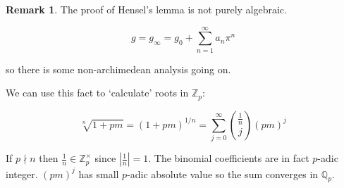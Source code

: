 \documentclass[openany]{amsbook}
\numberwithin{section}{chapter}
\theoremstyle{definition}
\newtheorem*{remark}{Remark}
\begin{document}
\begin{remark}
    The proof of Hensel's lemma is not purely algebraic.

    \[
        g = g_\infty = g_0 + \sum_{n=1}^{\infty} a_n \pi^n
    \]

    so there is some non-archimedean analysis going on.

    We can use this fact to `calculate' roots in \(\mathbb{Z}_p\):

    \[
        \sqrt[n]{1+pm} = (1+pm)^{1 / n} = \sum_{j=0}^{\infty} \binom{\frac{1}{n}}{j}(pm)^j
    \]

    If \(p\nmid n\) then \(\frac{1}{n} \in \mathbb{Z}_p^\times\) since \(\left\vert \frac{1}{n} \right\vert = 1\). The binomial coefficients are in fact \(p\)-adic integer. \((pm)^j\) has small \(p\)-adic absolute value so the sum converges in \(\mathbb{Q}_p\).
\end{remark}
\end{document}
